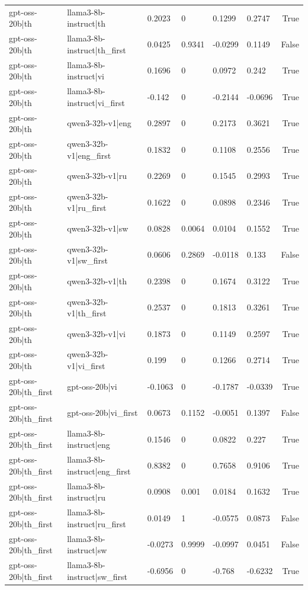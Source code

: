 \begin{table}
\begin{tabular}{llllllr}
gpt-oss-20b|th & llama3-8b-instruct|th & 0.2023 & 0 & 0.1299 & 0.2747 & True \\
gpt-oss-20b|th & llama3-8b-instruct|th_first & 0.0425 & 0.9341 & -0.0299 & 0.1149 & False \\
gpt-oss-20b|th & llama3-8b-instruct|vi & 0.1696 & 0 & 0.0972 & 0.242 & True \\
gpt-oss-20b|th & llama3-8b-instruct|vi_first & -0.142 & 0 & -0.2144 & -0.0696 & True \\
gpt-oss-20b|th & qwen3-32b-v1|eng & 0.2897 & 0 & 0.2173 & 0.3621 & True \\
gpt-oss-20b|th & qwen3-32b-v1|eng_first & 0.1832 & 0 & 0.1108 & 0.2556 & True \\
gpt-oss-20b|th & qwen3-32b-v1|ru & 0.2269 & 0 & 0.1545 & 0.2993 & True \\
gpt-oss-20b|th & qwen3-32b-v1|ru_first & 0.1622 & 0 & 0.0898 & 0.2346 & True \\
gpt-oss-20b|th & qwen3-32b-v1|sw & 0.0828 & 0.0064 & 0.0104 & 0.1552 & True \\
gpt-oss-20b|th & qwen3-32b-v1|sw_first & 0.0606 & 0.2869 & -0.0118 & 0.133 & False \\
gpt-oss-20b|th & qwen3-32b-v1|th & 0.2398 & 0 & 0.1674 & 0.3122 & True \\
gpt-oss-20b|th & qwen3-32b-v1|th_first & 0.2537 & 0 & 0.1813 & 0.3261 & True \\
gpt-oss-20b|th & qwen3-32b-v1|vi & 0.1873 & 0 & 0.1149 & 0.2597 & True \\
gpt-oss-20b|th & qwen3-32b-v1|vi_first & 0.199 & 0 & 0.1266 & 0.2714 & True \\
gpt-oss-20b|th_first & gpt-oss-20b|vi & -0.1063 & 0 & -0.1787 & -0.0339 & True \\
gpt-oss-20b|th_first & gpt-oss-20b|vi_first & 0.0673 & 0.1152 & -0.0051 & 0.1397 & False \\
gpt-oss-20b|th_first & llama3-8b-instruct|eng & 0.1546 & 0 & 0.0822 & 0.227 & True \\
gpt-oss-20b|th_first & llama3-8b-instruct|eng_first & 0.8382 & 0 & 0.7658 & 0.9106 & True \\
gpt-oss-20b|th_first & llama3-8b-instruct|ru & 0.0908 & 0.001 & 0.0184 & 0.1632 & True \\
gpt-oss-20b|th_first & llama3-8b-instruct|ru_first & 0.0149 & 1 & -0.0575 & 0.0873 & False \\
gpt-oss-20b|th_first & llama3-8b-instruct|sw & -0.0273 & 0.9999 & -0.0997 & 0.0451 & False \\
gpt-oss-20b|th_first & llama3-8b-instruct|sw_first & -0.6956 & 0 & -0.768 & -0.6232 & True \\

\end{tabular}
\end{table}
